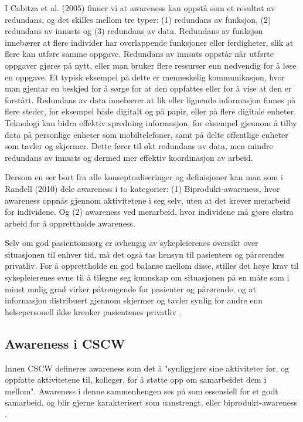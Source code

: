 \noindent
I Cabitza et al. (2005) \nocite{Cabitza} finner vi at awareness kan oppstå som et resultat av redundans, og det skilles mellom tre typer: (1) redundans av funksjon, (2) redundans av innsats og (3) redundans av data. Redundans av funksjon innebærer at flere individer har overlappende funksjoner eller ferdigheter, slik at flere kan utføre samme oppgave. Redundans av innsats oppstår når utførte oppgaver gjøres på nytt, eller man bruker flere ressurser enn nødvendig for å løse en oppgave. Et typisk eksempel på dette er menneskelig kommunikasjon, hvor man gjentar en beskjed for å sørge for at den oppfattes eller for å vise at den er forstått. Redundans av data innebærer at lik eller lignende informasjon finnes på flere steder, for eksempel både digitalt og på papir, eller på flere digitale enheter. Teknologi kan bidra effektiv spredning informasjon, for eksempel gjennom å tilby data på personlige enheter som mobiltelefoner, samt på delte offentlige enheter som tavler og skjermer. Dette fører til økt redundans av data, men mindre redundans av innsats og dermed mer effektiv koordinasjon av arbeid.

\noindent
Dersom en ser bort fra alle konseptualiseringer og definisjoner kan man som i Randell (2010) dele awareness i to kategorier: (1) Biprodukt-awareness, hvor awareness oppnås gjennom aktivitetene i seg selv, uten at det krever merarbeid for individene. Og (2) awareness ved merarbeid, hvor individene må gjøre ekstra arbeid for å opprettholde awareness. 

\noindent
Selv om god pasientomsorg er avhengig av sykepleierenes oversikt over situasjonen til enhver tid, må det også tas hensyn til pasienters og pårørendes privatliv. For å opprettholde en god balanse mellom disse, stilles det høye krav til sykepleierenes evne til å tilegne seg kunnskap om situasjonen på en måte som i minst mulig grad virker påtrengende for pasienter og pårørende, og at informasjon distribuert gjennom skjermer og tavler synlig for andre enn helsepersonell ikke krenker pasientenes privatliv \cite{Ebright10}.

\subsection{Awareness i CSCW}
\label{awareness_CSCW}
Innen CSCW defineres awareness som det å "synliggjøre sine aktiviteter for, og oppfatte aktivitetene til, kolleger, for å støtte opp om samarbeidet dem i mellom". Awareness i denne sammenhengen ses på som essensiell for et godt samarbeid, og blir gjerne karakterisert som uanstrengt, eller biprodukt-awareness \cite{Randell}. 

